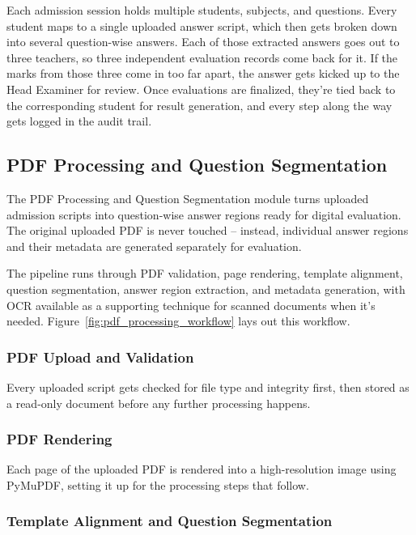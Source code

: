 Each admission session holds multiple students, subjects, and questions. Every student maps to a single uploaded answer script, which then gets broken down into several question-wise answers. Each of those extracted answers goes out to three teachers, so three independent evaluation records come back for it. If the marks from those three come in too far apart, the answer gets kicked up to the Head Examiner for review. Once evaluations are finalized, they're tied back to the corresponding student for result generation, and every step along the way gets logged in the audit trail.

\subsection{PDF Processing and Question Segmentation}

The PDF Processing and Question Segmentation module turns uploaded admission scripts into question-wise answer regions ready for digital evaluation. The original uploaded PDF is never touched -- instead, individual answer regions and their metadata are generated separately for evaluation.

The pipeline runs through PDF validation, page rendering, template alignment, question segmentation, answer region extraction, and metadata generation, with OCR available as a supporting technique for scanned documents when it's needed. Figure~\ref{fig:pdf_processing_workflow} lays out this workflow.

\subsubsection{PDF Upload and Validation}

Every uploaded script gets checked for file type and integrity first, then stored as a read-only document before any further processing happens.

\subsubsection{PDF Rendering}

Each page of the uploaded PDF is rendered into a high-resolution image using PyMuPDF, setting it up for the processing steps that follow.

\subsubsection{Template Alignment and Question Segmentation}

